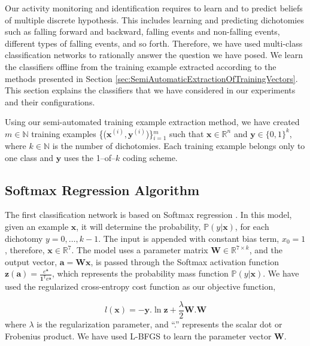 \documentclass[]{IEEEtran}
\begin{document}
Our activity monitoring and identification requires to learn and to predict beliefs of 
multiple 
discrete hypothesis. This includes learning and predicting dichotomies such as falling 
forward and 
backward, falling events and non-falling events, different types of falling events, and 
so forth. 
Therefore, 
we have used multi-class classification networks to rationally answer the question we 
have posed. We learn the classifiers offline from the training example extracted 
according to the methods presented in Section 
\ref{sec:SemiAutomaticExtractionOfTrainingVectors}. This section explains the classifiers 
that we have considered in our experiments and their configurations. 

Using our semi-automated training example extraction method, we have created $m \in 
\mathbb{N}$ 
training examples 
\{($\mathbf{x}^{(i)}, \mathbf{y}^{(i)}$)\}$_{i=1}^m$ such that $\mathbf{x} \in 
\mathbb{R}^{n}$ 
and 
$\mathbf{y} \in 
\{0,1\}^k$, where  $k \in 
\mathbb{N}$ is the number of dichotomies. Each training example belongs only to one class 
and $\mathbf{y}$ uses the 1--of--$k$ coding scheme.    

\subsection{Softmax Regression Algorithm}
\label{sec:SoftmaxRegrationAlgorthm}

The first classification network is based on Softmax regression \cite{Bishop06a}. In this 
model, given an 
example $\mathbf{x}$, it will determine the probability, $\mathbb{P}(y | \mathbf{x})$, 
for 
each dichotomy $y=0,\ldots,k-1$. The input is appended with constant bias 
term, $x_0 = 1$, therefore, $\mathbf{x} \in \mathbb{R}^7$. The model uses a parameter 
matrix 
$\mathbf{W} 
\in \mathbb{R}^{7 \times k}$, and the output vector, $\mathbf{a} = \mathbf{Wx}$, is 
passed 
through 
the 
Softmax 
activation function $\mathbf{z(a)} = \frac{e^{\mathbf{a}}}{\mathbf{1}^\mathtt{T}
e^{\mathbf{a}}}$, which represents the probability mass function $\mathbb{P}(y | 
\mathbf{x})$. We have 
used the regularized cross-entropy cost function as our objective function, 

\begin{equation} 
l(\mathbf{x}) = -\mathbf{y}.\ln \mathbf{z} + \frac{\lambda}{2} \mathbf{W}.\mathbf{W}
\label{eq:objective-function}
\end{equation}
 where  $\lambda$ is the regularization parameter, and ``.'' represents the scalar dot  
or Frobenius product.
 We have used L-BFGS \cite{DBLP:conf/icml/LeNCLPN11} to learn the 
parameter vector $\mathbf{W}$.  
\end{document}
